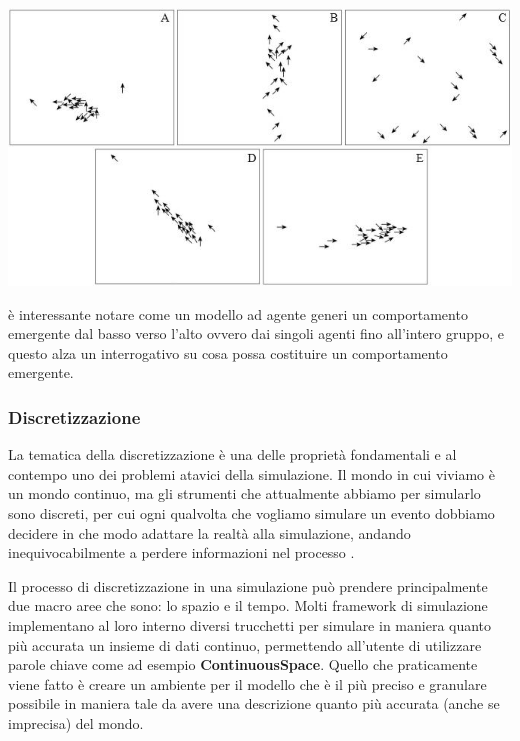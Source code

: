 \begin{minipage}{\linewidth}
    \centering
    \includegraphics{img/Figure6b.jpg}
    \label{fig:flock_emergent_behaviour}
\end{minipage}

è interessante notare come un modello ad agente generi un comportamento emergente dal basso 
verso l'alto ovvero dai singoli agenti fino all'intero gruppo, e questo alza un interrogativo 
su cosa possa costituire un comportamento emergente. 

\subsubsection{Discretizzazione}
La tematica della discretizzazione è una delle proprietà fondamentali
e al contempo uno dei problemi atavici della simulazione.
Il mondo in cui viviamo è un mondo continuo, ma gli strumenti
che attualmente abbiamo per simularlo sono discreti, per cui 
ogni qualvolta che vogliamo simulare un evento dobbiamo decidere 
in che modo adattare la realtà alla simulazione, andando 
inequivocabilmente a perdere informazioni nel processo 
\cite{KONSTANTINOUDIS2020100319}. 

Il processo di discretizzazione in una simulazione può prendere 
principalmente due macro aree che sono: lo spazio e il tempo. 
Molti framework di simulazione implementano al loro interno 
diversi trucchetti per simulare in maniera quanto più accurata
un insieme di dati continuo, permettendo all'utente di utilizzare
parole chiave come ad esempio \textbf{ContinuousSpace}. Quello che praticamente
viene fatto è creare un ambiente per il modello che è il più
preciso e granulare possibile in maniera tale da avere una descrizione
quanto più accurata (anche se imprecisa) del mondo. 

